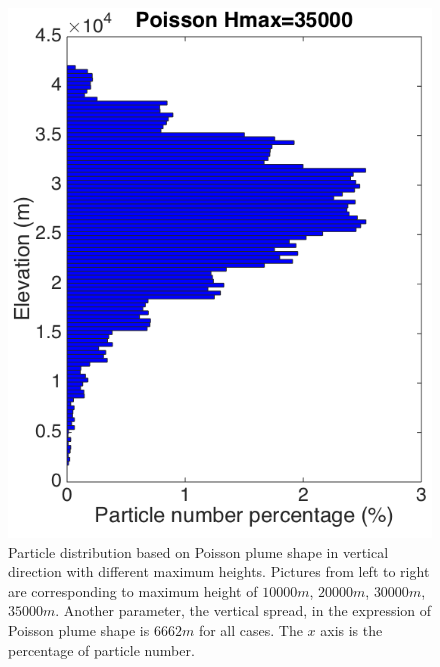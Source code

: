 \begin{figure}[!htb]
\begin{minipage}{.247 \textwidth}
        \includegraphics[width=0.99 \textwidth]{Chapter-7/Figures/Possion-Hmax35k-ParticleDis-z}
    \end{minipage}%
    \caption{Particle distribution based on Poisson plume shape in vertical direction with different maximum heights. Pictures from left to right are corresponding to maximum height of $10000 m$,  $20000 m$,  $30000 m$, $35000 m$. Another parameter, the vertical spread, in the expression of Poisson plume shape is $6662 m$ for all cases. The $x$ axis is the percentage of particle number.}
    \label{fig:Particle-distribution-Plume-calibrate-semiempirical}
\end{figure}

